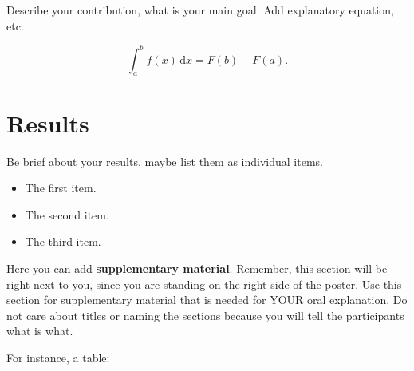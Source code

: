 \documentclass[a0paper,fleqn]{betterposter}
\begin{document}
{Describe your contribution, what is your main goal. Add explanatory equation, etc.

\begin{equation}
\int_a^b f(x)\,\mathrm{d}x = F(b)-F(a).
\end{equation}

\section{Results}

Be brief about your results, maybe list them as individual items. 

\begin{itemize}
\item The first item.
\item The second item.
\item The third item.
\end{itemize}




}{

Here you can add \textbf{supplementary material}. Remember, this section will be 
right next to you, since you are standing on the right side of the poster. 
Use this section for supplementary material that is needed for YOUR oral 
explanation. Do not care about titles or naming the sections because you will 
tell the participants what is what.


\vspace*{3.0em}

For instance, a table:


\vspace*{3.0em}

}
\end{document}
